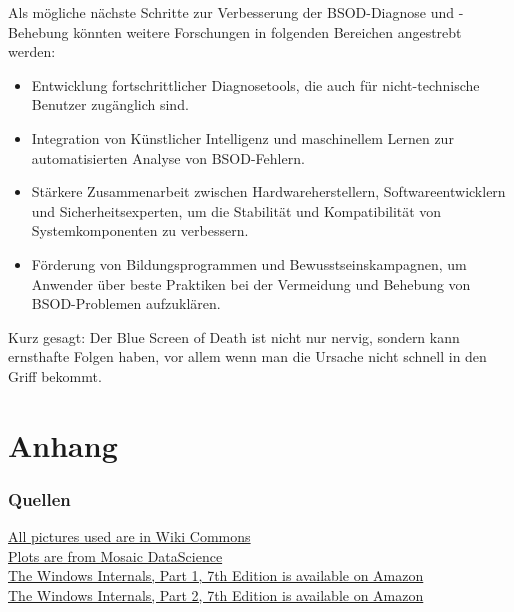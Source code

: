 \documentclass[paper=a4,fontsize=12pt,ngerman,parskip=half]{scrartcl}
\begin{document}
Als mögliche nächste Schritte zur Verbesserung der BSOD-Diagnose und -Behebung könnten weitere Forschungen in folgenden Bereichen angestrebt werden:

\begin{itemize}
  \item Entwicklung fortschrittlicher Diagnosetools, die auch für nicht-technische Benutzer zugänglich sind.
  \item Integration von Künstlicher Intelligenz und maschinellem Lernen zur automatisierten Analyse von BSOD-Fehlern.
  \item Stärkere Zusammenarbeit zwischen Hardwareherstellern, Softwareentwicklern und Sicherheitsexperten, um die Stabilität und Kompatibilität von Systemkomponenten zu verbessern.
  \item Förderung von Bildungsprogrammen und Bewusstseinskampagnen, um Anwender über beste Praktiken bei der Vermeidung und Behebung von BSOD-Problemen aufzuklären.\cite{microsoft_support}
\end{itemize}

Kurz gesagt: Der Blue Screen of Death ist nicht nur nervig, sondern kann ernsthafte Folgen haben, vor allem wenn man die Ursache nicht schnell in den Griff bekommt.


\clearpage
\renewcommand\refname{Literaturverzeichnis}


\clearpage
\appendix
\part*{Anhang}
\section{Quellen}
\href{https://commons.wikimedia.org/wiki/BSoD?uselang=de}{All pictures used are in Wiki Commons}\cite{wikicommons_bsod}\\
\href{https://mosaicdatascience.com/2017/11/30/diagnosing-windows-10-crashes-predictive-ai-services/}{Plots are from Mosaic DataScience}\cite{mosaic2017}\\
\href{https://www.amazon.de/-/en/Pavel-Yosifovich/dp/0735684189}{The Windows Internals, Part 1, 7th Edition is available on Amazon}\cite{WindowsInternalsPart1}\\
\href{https://www.amazon.de/-/en/Mark-Russinovich/dp/0135462401}{The Windows Internals, Part 2, 7th Edition is available on Amazon}\cite{WindowsInternalsPart2}
\end{document}
